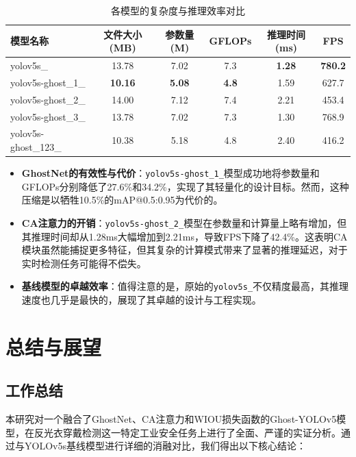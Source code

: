 \documentclass[a4paper]{ctexart}
\begin{document}
\begin{table}[H]
    \centering
    \caption{各模型的复杂度与推理效率对比}
    \label{tab:complexity-efficiency}
    \begin{tabular}{lccccc}
        \toprule
        \textbf{模型名称} & \textbf{文件大小(MB)} & \textbf{参数量(M)} & \textbf{GFLOPs} & \textbf{推理时间(ms)} & \textbf{FPS} \\
        \midrule
        yolov5s\_             & 13.78 & 7.02 & 7.3 & \textbf{1.28} & \textbf{780.2} \\
        yolov5s-ghost\_1\_    & \textbf{10.16} & \textbf{5.08} & \textbf{4.8} & 1.59 & 627.7 \\
        yolov5s-ghost\_2\_    & 14.00 & 7.12 & 7.4 & 2.21 & 453.4 \\
        yolov5s-ghost\_3\_    & 13.78 & 7.02 & 7.3 & 1.30 & 768.9 \\
        yolov5s-ghost\_123\_  & 10.38 & 5.18 & 4.8 & 2.40 & 416.2 \\
        \bottomrule
    \end{tabular}
\end{table}

\begin{itemize}
    \item \textbf{GhostNet的有效性与代价}：\texttt{yolov5s-ghost\_1\_}模型成功地将参数量和GFLOPs分别降低了27.6\%和34.2\%，实现了其轻量化的设计目标。然而，这种压缩是以牺牲10.5\%的mAP@0.5:0.95为代价的。
    \item \textbf{CA注意力的开销}：\texttt{yolov5s-ghost\_2\_}模型在参数量和计算量上略有增加，但其推理时间却从1.28ms大幅增加到2.21ms，导致FPS下降了42.4\%。这表明CA模块虽然能捕捉更多特征，但其复杂的计算模式带来了显著的推理延迟，对于实时检测任务可能得不偿失。
    \item \textbf{基线模型的卓越效率}：值得注意的是，原始的\texttt{yolov5s\_}不仅精度最高，其推理速度也几乎是最快的，展现了其卓越的设计与工程实现。
\end{itemize}

\section{总结与展望}

\subsection{工作总结}
本研究对一个融合了GhostNet、CA注意力和WIOU损失函数的Ghost-YOLOv5模型，在反光衣穿戴检测这一特定工业安全任务上进行了全面、严谨的实证分析。通过与YOLOv5s基线模型进行详细的消融对比，我们得出以下核心结论：
\end{document}
